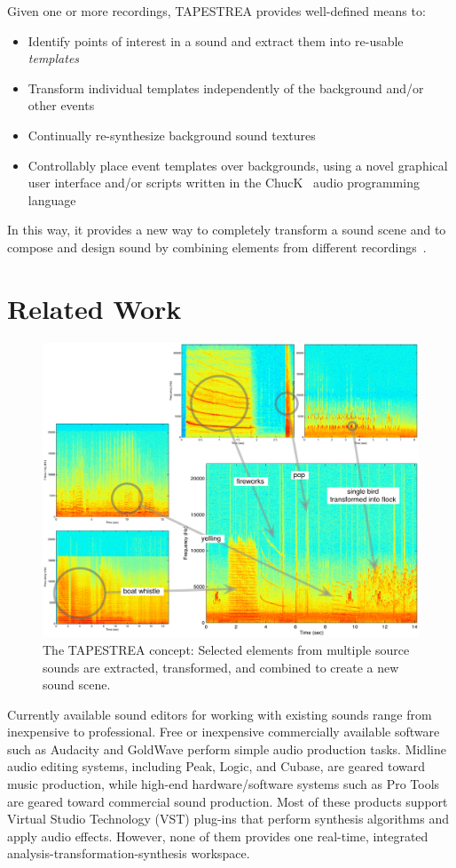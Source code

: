 \documentclass{sig-alt-release2}
\begin{document}
Given one or more recordings, TAPESTREA provides well-defined means to: 
\begin{itemize}
\setlength\itemsep{-3pt}
\item Identify points of interest in a sound and extract them into re-usable \textit{templates}
\item Transform individual templates independently of the background and/or other events
\item Continually re-synthesize background sound textures
\item Controllably place event templates over backgrounds, using a novel graphical user interface and/or scripts written in the ChucK~\cite{Wang03} audio programming language
\end{itemize}
In this way, it provides a new way to completely transform a sound scene and to compose and design sound by combining elements from different recordings~\cite{Misra06b,Misra07}.

\section{Related Work}

\begin{figure}[tbh!]
\centering
\includegraphics[width=.825\textwidth]{teaser_sm.pdf} %
\caption{The TAPESTREA concept: Selected elements from multiple source sounds are extracted, transformed, and combined to create a new sound scene.}
\label{fig:concept}
\end{figure}

Currently available sound editors for working with existing sounds range from inexpensive to professional. Free or inexpensive commercially available software such as Audacity and GoldWave perform simple audio production tasks. Midline audio editing systems, including Peak, Logic, and Cubase, are geared toward music production, while high-end hardware/software systems such as Pro Tools are geared toward commercial sound production. Most of these products support Virtual Studio Technology (VST) plug-ins that perform synthesis algorithms and apply audio effects. However, none of them provides one real-time, integrated analysis-transformation-synthesis workspace. 
\end{document}
